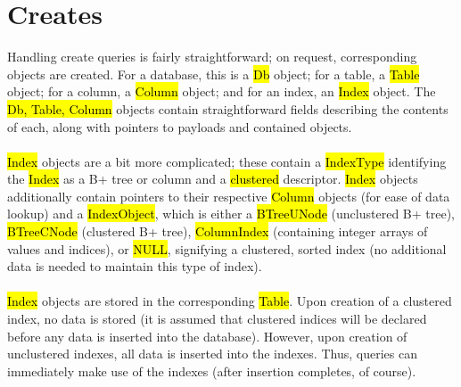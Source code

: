 \documentclass[paper=letter, fontsize=11pt]{scrartcl}
\numberwithin{equation}{section}
\numberwithin{figure}{section}
\numberwithin{table}{section}
\renewcommand{\texttt}[1]{\hl{\ttfamily #1}}
\newcommand{\ttt}[1]{\hl{\ttfamily #1}}
\begin{document}
\section{Creates}
Handling create queries is fairly straightforward; on request, corresponding objects are created.  For a database, this is a \texttt{Db} object; for a table, a \texttt{Table} object; for a column, a \texttt{Column} object; and for an index, an \texttt{Index} object.  The \texttt{Db, Table, Column} objects contain straightforward fields describing the contents of each, along with pointers to payloads and contained objects.  
\\\\\texttt{Index} objects are a bit more complicated; these contain a \texttt{IndexType} identifying the \texttt{Index} as a B+ tree or column and a \texttt{clustered} descriptor.  \ttt{Index} objects additionally contain pointers to their respective \ttt{Column} objects (for ease of data lookup) and a \ttt{IndexObject}, which is either a \ttt{BTreeUNode} (unclustered B+ tree), \ttt{BTreeCNode} (clustered B+ tree), \ttt{ColumnIndex} (containing integer arrays of values and indices), or \ttt{NULL}, signifying a clustered, sorted index (no additional data is needed to maintain this type of index).
\\\\\ttt{Index} objects are stored in the corresponding \ttt{Table}.  Upon creation of a clustered index, no data is stored (it is assumed that clustered indices will be declared before any data is inserted into the database).  However, upon creation of unclustered indexes, all data is inserted into the indexes.  Thus, queries can immediately make use of the indexes (after insertion completes, of course).

\begin{center}
\end{center}
\end{document}
